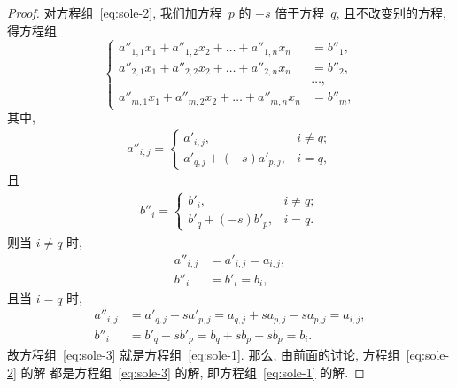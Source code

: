 \documentclass[../libro.tex]{subfiles}
\begin{document}
\begin{proof}
    对方程组~\eqref{eq:sole-2},
    我们加方程~\(p\) 的 \(-s\) 倍于方程~\(q\),
    且不改变别的方程,
    得方程组
    \begin{equation}
        \left\{ %
        \begin{aligned}
            a''_{1,1} x_1 + a''_{1,2} x_2 + \dots + a''_{1,n} x_n & = b''_1, \\
            a''_{2,1} x_1 + a''_{2,2} x_2 + \dots + a''_{2,n} x_n & = b''_2, \\
            & \dots, \\
            a''_{m,1} x_1 + a''_{m,2} x_2 + \dots + a''_{m,n} x_n & = b''_m,
        \end{aligned}
        \right. %
        \label{eq:sole-3}
    \end{equation}
    其中,
    \begin{align*}
        a''_{i,j} =
        \begin{cases}
            a'_{i,j},                 & i \neq q; \\
            a'_{q,j} + (-s) a'_{p,j}, & i = q,
        \end{cases}
    \end{align*}
    且
    \begin{align*}
        b''_i =
        \begin{cases}
            b'_i,             & i \neq q; \\
            b'_q + (-s) b'_p, & i = q.
        \end{cases}
    \end{align*}
    则当 \(i \neq q\) 时,
    \begin{align*}
        a''_{i,j} & = a'_{i,j} = a_{i,j}, \\
        b''_i     & = b'_i = b_i,
    \end{align*}
    且当 \(i = q\) 时,
    \begin{align*}
        a''_{i,j}
        & = a'_{q,j} - s a'_{p,j}
        = a_{q,j} + s a_{p,j} - s a_{p,j}
        = a_{i,j},                 \\
        b''_i
        & = b'_q - s b'_p
        = b_q + s b_p - s b_p
        = b_i.
    \end{align*}
    故方程组~\eqref{eq:sole-3} 就是方程组~\eqref{eq:sole-1}.
    那么, 由前面的讨论,
    方程组~\eqref{eq:sole-2} 的解%
    都是方程组~\eqref{eq:sole-3} 的解,
    即方程组~\eqref{eq:sole-1} 的解.
\end{proof}
\end{document}
